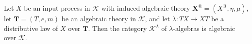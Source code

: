 Let $X$ be an input process in $\mathcal{K}$ with induced algebraic theory $\mathbf{X}^{\mathbf{@}} = (X^{\mathbf{@}}, \eta, \mu)$, let $\mathbf{T} = (T, e, m)$ be an algebraic theory in $\mathcal{K}$, and let $\lambda \colon TX \longrightarrow XT$ be a distributive law of $X$ over $\mathbf{T}$. Then the category $\mathcal{K}^{\lambda}$ of $\lambda$-algebras is algebraic over $\mathcal{K}$.
